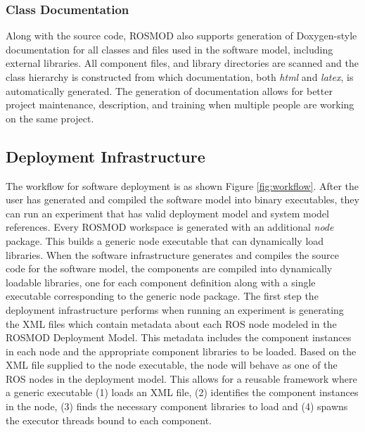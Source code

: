 \subsubsection{Class Documentation}

Along with the source code, ROSMOD also supports generation of
Doxygen-style documentation for all classes and files used in the
software model, including external libraries. All component files, and
library directories are scanned and the class hierarchy is constructed
from which documentation, both \emph{html} and \emph{latex}, is
automatically generated.  The generation of documentation allows for
better project maintenance, description, and training when multiple
people are working on the same project.

\subsection{Deployment Infrastructure}
\label{sec:Deployment_Infrastructure}

The workflow for software deployment is as shown Figure
\ref{fig:workflow}. After the user has generated and compiled the
software model into binary executables, they can run an experiment
that has valid deployment model and system model references. Every
ROSMOD workspace is generated with an additional \emph{node}
package. This builds a generic node executable that can dynamically
load libraries. When the software infrastructure generates and
compiles the source code for the software model, the components are
compiled into dynamically loadable libraries, one for each component
definition along with a single executable corresponding to the generic
node package. The first step the deployment infrastructure performs
when running an experiment is generating the XML files which contain
metadata about each ROS node modeled in the ROSMOD Deployment
Model. This metadata includes the component instances in each node and the
appropriate component libraries to be loaded. Based on the XML file
supplied to the node executable, the node will behave as one of the
ROS nodes in the deployment model. This allows for a reusable
framework where a generic executable (1) loads an XML file, (2)
identifies the component instances in the node, (3) finds the
necessary component libraries to load and (4) spawns the executor
threads bound to each component.


